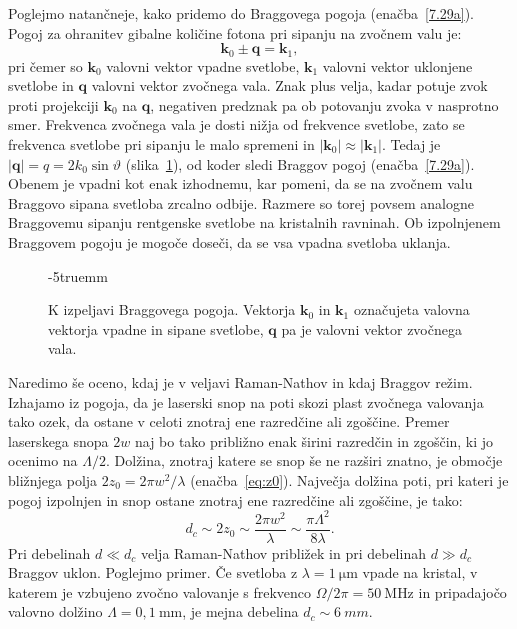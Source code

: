 Poglejmo natančneje, kako pridemo do Braggovega pogoja (enačba~\ref{7.29a}). Pogoj
za ohranitev gibalne količine fotona pri sipanju na zvočnem valu je:
\begin{equation}
\mathbf{k}_{0}\pm\mathbf{q}=\mathbf{k}_{1},
\label{7.30}
\end{equation}
pri čemer so $\mathbf{k}_{0}$ valovni vektor vpadne svetlobe, $\mathbf{k}_{1}$
valovni vektor uklonjene svetlobe in $\mathbf{q}$ valovni
vektor zvočnega vala. Znak plus velja, kadar potuje zvok proti projekciji
$\mathbf{k}_{0}$ na $\mathbf{q}$, negativen predznak pa ob potovanju zvoka v nasprotno smer. 
Frekvenca zvočnega vala je dosti nižja od frekvence svetlobe, zato se frekvenca svetlobe 
pri sipanju le malo spremeni in $|\mathbf{k}_{0}| \approx |\mathbf{k}_{1}|$.
Tedaj je $|\mathbf{q}| = q=2k_{0}\sin\vartheta$ 
(slika~\ref{fig:ao_bragg3}), od koder sledi Braggov pogoj 
(enačba~\ref{7.29a}). Obenem je vpadni kot enak izhodnemu, kar pomeni, da se na
zvočnem valu Braggovo sipana svetloba zrcalno odbije. Razmere so torej
povsem analogne Braggovemu sipanju rentgenske svetlobe na kristalnih
ravninah. Ob izpolnjenem Braggovem pogoju je mogoče doseči, 
da se vsa vpadna svetloba uklanja.
\begin{figure}[ht]
\centering
\def\svgwidth{40truemm} 

\caption{K izpeljavi Braggovega pogoja. Vektorja $\mathbf{k}_0$ in $\mathbf{k}_1$ označujeta
valovna vektorja vpadne in sipane svetlobe, $\mathbf{q}$ pa je valovni vektor zvočnega vala.}
\label{fig:ao_bragg3}
\vglue-5truemm
\end{figure}
\begin{remark}
Naredimo še oceno, kdaj je v veljavi Raman-Nathov in kdaj Braggov režim. 
Izhajamo iz pogoja, da je laserski snop na poti skozi plast zvočnega 
valovanja tako ozek, da ostane v celoti znotraj
ene razredčine ali zgoščine. Premer laserskega snopa $2w$ naj bo tako približno enak širini
razredčin in zgoščin, ki jo ocenimo na $\Lambda/2$. Dolžina, znotraj katere se snop še ne razširi znatno,
je območje bližnjega polja $2z_0 = 2 \pi w^2/\lambda$ (enačba~\ref{eq:z0}). Največja dolžina poti, pri 
kateri je pogoj izpolnjen in snop ostane znotraj ene razredčine ali zgoščine, je tako:
\begin{equation}
d_c \sim 2z_0 \sim \frac{2 \pi w^2}{\lambda} \sim \frac{\pi \Lambda^2}{8 \lambda}.
\end{equation}
Pri debelinah $d \ll d_c$ velja Raman-Nathov približek in pri debelinah $d \gg d_c$ Braggov uklon.
Poglejmo primer. Če svetloba z $\lambda = 1~\si{\micro\metre}$ vpade na kristal, 
v katerem je vzbujeno zvočno valovanje s frekvenco $\Omega/2\pi = 50~\si{\mega\hertz}$ in
pripadajočo valovno dolžino $\Lambda = 0,1~\si{\milli\metre}$, je mejna debelina $d_c \sim 6~\si{mm}$.
\end{remark}
